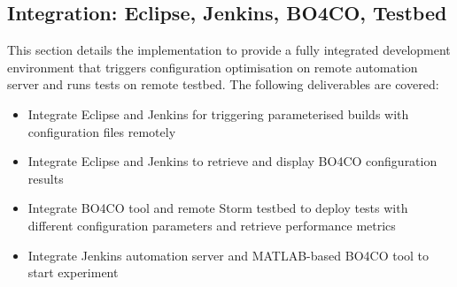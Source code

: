 \newpage
\subsection{Integration: Eclipse, Jenkins, BO4CO, Testbed}
This section details the implementation to provide a fully integrated development environment that triggers configuration optimisation on remote automation server and runs tests on remote testbed. The following deliverables are covered:
\begin{itemize}
\item Integrate Eclipse and Jenkins for triggering parameterised builds with configuration files remotely
\item Integrate Eclipse and Jenkins to retrieve and display BO4CO configuration results
\item Integrate BO4CO tool and remote Storm testbed to deploy tests with different configuration parameters and retrieve performance metrics
\item Integrate Jenkins automation server and MATLAB-based BO4CO tool to start experiment
\end{itemize}

